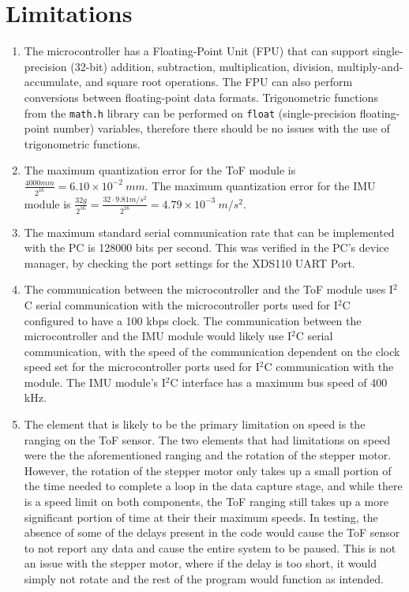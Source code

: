\documentclass[12pt]{article}
\begin{document}
\section*{Limitations}
\begin{enumerate}[label=(\arabic*)]
    \item %
    The microcontroller has a Floating-Point Unit (FPU) that can support single-precision (32-bit) addition, subtraction, multiplication, division, multiply-and-accumulate, and square root operations. The FPU can also perform conversions between floating-point data formats. Trigonometric functions from the \texttt{math.h} library can be performed on \texttt{float} (single-precision floating-point number) variables, therefore there should be no issues with the use of trigonometric functions.
    \item %
    The maximum quantization error for the ToF module is $\frac{4000mm}{2^{16}} = 6.10 \times 10^{-2} \ mm$. The maximum quantization error for the IMU module is $\frac{32g}{2^{16}}=\frac{32\cdot9.81 m/s^2}{2^{16}} = 4.79 \times 10^{-3} \ m/s^2$.  
    \item %
    The maximum standard serial communication rate that can be implemented with the PC is 128000 bits per second. This was verified in the PC's device manager, by checking the port settings for the XDS110 UART Port.
    \item %
    The communication between the microcontroller and the ToF module uses I$^2$C serial communication with the microcontroller ports used for I$^2$C configured to have a 100 kbps clock. The communication between the microcontroller and the IMU module would likely use I$^2$C serial communication, with the speed of the communication dependent on the clock speed set for the microcontroller ports used for I$^2$C communication with the module. The IMU module's I$^2$C interface has a maximum bus speed of 400 kHz.   
    \item %
    The element that is likely to be the primary limitation on speed is the ranging on the ToF sensor. The two elements that had limitations on speed were the the aforementioned ranging and the rotation of the stepper motor. However, the rotation of the stepper motor only takes up a small portion of the time needed to complete a loop in the data capture stage, and while there is a speed limit on both components, the ToF ranging still takes up a more significant portion of time at their their maximum speeds. In testing, the absence of some of the delays present in the code would cause the ToF sensor to not report any data and cause the entire system to be paused. This is not an issue with the stepper motor, where if the delay is too short, it would simply not rotate and the rest of the program would function as intended. 

\end{enumerate}
\end{document}
